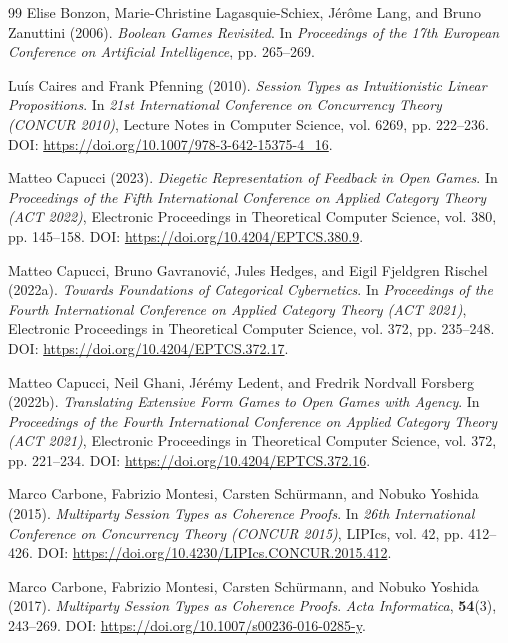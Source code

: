 \documentclass[11pt,a4paper]{article}
\numberwithin{equation}{section}
\theoremstyle{definition}
\theoremstyle{remark}
\theoremstyle{plain}
\begin{document}
\begin{thebibliography}{99}
Elise Bonzon, Marie-Christine Lagasquie-Schiex, Jérôme Lang, and Bruno Zanuttini (2006).
\newblock \emph{Boolean Games Revisited}.
\newblock In \emph{Proceedings of the 17th European Conference on Artificial Intelligence}, pp. 265--269.

Luís Caires and Frank Pfenning (2010).
\newblock \emph{Session Types as Intuitionistic Linear Propositions}.
\newblock In \emph{21st International Conference on Concurrency Theory (CONCUR 2010)}, Lecture Notes in Computer Science, vol. 6269, pp. 222--236.
\newblock DOI: \url{https://doi.org/10.1007/978-3-642-15375-4_16}.

Matteo Capucci (2023).
\newblock \emph{Diegetic Representation of Feedback in Open Games}.
\newblock In \emph{Proceedings of the Fifth International Conference on Applied Category Theory (ACT 2022)}, Electronic Proceedings in Theoretical Computer Science, vol. 380, pp. 145--158.
\newblock DOI: \url{https://doi.org/10.4204/EPTCS.380.9}.

Matteo Capucci, Bruno Gavranović, Jules Hedges, and Eigil Fjeldgren Rischel (2022a).
\newblock \emph{Towards Foundations of Categorical Cybernetics}.
\newblock In \emph{Proceedings of the Fourth International Conference on Applied Category Theory (ACT 2021)}, Electronic Proceedings in Theoretical Computer Science, vol. 372, pp. 235--248.
\newblock DOI: \url{https://doi.org/10.4204/EPTCS.372.17}.

Matteo Capucci, Neil Ghani, Jérémy Ledent, and Fredrik Nordvall Forsberg (2022b).
\newblock \emph{Translating Extensive Form Games to Open Games with Agency}.
\newblock In \emph{Proceedings of the Fourth International Conference on Applied Category Theory (ACT 2021)}, Electronic Proceedings in Theoretical Computer Science, vol. 372, pp. 221--234.
\newblock DOI: \url{https://doi.org/10.4204/EPTCS.372.16}.

Marco Carbone, Fabrizio Montesi, Carsten Schürmann, and Nobuko Yoshida (2015).
\newblock \emph{Multiparty Session Types as Coherence Proofs}.
\newblock In \emph{26th International Conference on Concurrency Theory (CONCUR 2015)}, LIPIcs, vol. 42, pp. 412--426.
\newblock DOI: \url{https://doi.org/10.4230/LIPIcs.CONCUR.2015.412}.

Marco Carbone, Fabrizio Montesi, Carsten Schürmann, and Nobuko Yoshida (2017).
\newblock \emph{Multiparty Session Types as Coherence Proofs}.
\newblock \emph{Acta Informatica}, \textbf{54}(3), 243--269.
\newblock DOI: \url{https://doi.org/10.1007/s00236-016-0285-y}.


\end{thebibliography}
\end{document}
